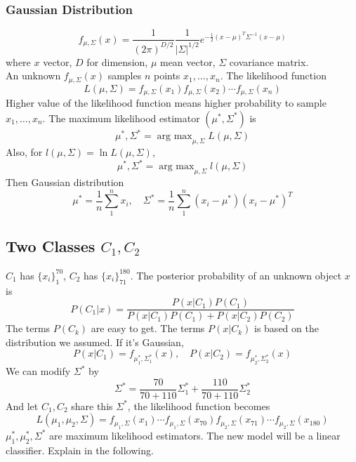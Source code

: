 \documentclass{article}
\DeclareMathOperator*{\argmax}{arg~max}
\begin{document}
            \subsubsection{Gaussian Distribution}
                \[
                    f_{\mu,\Sigma}(x)=\frac{1}{(2\pi)^{D/2}}\frac{1}{|\Sigma|^{1/2}}e^{-\frac{1}{2}(x-\mu)^T\Sigma^{-1}(x-\mu)}
                \]
                where $x$ vector, $D$ for dimension, $\mu$ mean vector, $\Sigma$ covariance matrix.\\
                An unknown $f_{\mu,\Sigma}(x)$ samples $n$ points $x_1,\dots,x_n$. The likelihood function
                \[
                    L(\mu,\Sigma)=f_{\mu,\Sigma}(x_1)f_{\mu,\Sigma}(x_2)\cdots f_{\mu,\Sigma}(x_n)
                \]
                Higher value of the likelihood function means higher probability to sample $x_1,\dots,x_n$. The maximum likelihood estimator $(\mu^*,\Sigma^*)$ is
                \[
                    \mu^*,\Sigma^* = \argmax_{\mu,\Sigma} L(\mu,\Sigma)
                \]
                Also, for $l(\mu,\Sigma)=\ln L(\mu,\Sigma)$,
                \[
                    \mu^*,\Sigma^* = \argmax_{\mu,\Sigma} l(\mu,\Sigma)
                \]
                Then Gaussian distribution
                \[\mu^* = \frac{1}{n}\sum_1^n x_i,\quad \Sigma^* = \frac{1}{n}\sum_1^n(x_i-\mu^*)(x_i-\mu^*)^T\]
    
        \subsection{Two Classes \texorpdfstring{$C_1,C_2$}{}}
            $C_1$ has $\{x_i\}_1^{70}$, $C_2$ has $\{x_i\}_{71
            }^{180}$. The posterior probability of an unknown object $x$ is
            \[
                P(C_1|x) = \frac{P(x|C_1)P(C_1)}{P(x|C_1)P(C_1)+P(x|C_2)P(C_2)}
            \]
            The terms $P(C_k)$ are easy to get. The terms $P(x|C_k)$ is based on the distribution we assumed. If it's Gaussian,
            \[
                P(x|C_1) = f_{\mu_1^*,\Sigma_1^*}(x),\quad P(x|C_2) = f_{\mu_2^*,\Sigma_2^*}(x)
            \]
            We can modify $\Sigma^*$ by
            \[
                \Sigma^* = \frac{70}{70+110}\Sigma_1^* + \frac{110}{70+110}\Sigma_2^*
            \]
            And let $C_1,C_2$ share this $\Sigma^*$, the likelihood function becomes
            \[
                L(\mu_1,\mu_2,\Sigma) = f_{\mu_1,\Sigma}(x_1)\cdots f_{\mu_1,\Sigma}(x_{70})f_{\mu_2,\Sigma}(x_{71})\cdots f_{\mu_2,\Sigma}(x_{180})
            \]
            $\mu_1^*,\mu_2^*,\Sigma^*$ are maximum likelihood estimators.
            The new model will be a linear classifier. Explain in the following.
\end{document}
